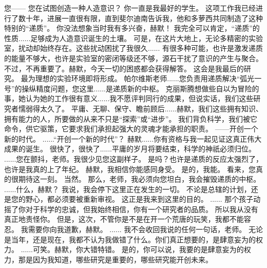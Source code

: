 \documentclass[openany]{book}
\begin{document}
\begin{dialogue}
     您——
     您在试图创造一种人造意识？
     你一直是我最好的学生。
     这项工作我已经进行了数十年，进展一直很有限，直到斐尔迪南告诉我，他和多萝西共同制造了这种特别的“递质”。
     你没法想象当时我有多兴奋，赫默！
     我完全可以肯定，“递质”的性质......足够成为人造意识诞生的土壤。
     可是，在这片大地上，无论多精密的实验室，扰动却始终存在。这些扰动困扰了我很久......
     有很多种可能，也许是激发递质的能量不够大，也许是实验室的密闭等级还不够，源石干扰了意识的产生与聚合。
     不过，不再重要了。赫默，今天一切的困惑都会获得解答。
     这会是我最后的研究。
     最为理想的实验环境即将形成。
     帕尔维斯老师......您负责用递质解决“弧光一号”的操纵精度问题，您这里......是递质新的中枢。
     克丽斯腾想做些自以为冒险的事，她认为她的工作很有意义......我不愿评判同行的成果，但说实话，我们这些研究者懦弱得太久了。
     平庸、无聊、保守、瞻前顾后......赫默，我们这些拥有知识、拥有能力的人，所要做的从来不只是“探索”或“进步”。
     我们背负科学，我们被它命令，供它驱策，它要求我们承担起强大的灵魂才能承担的职责。
     ——开创一个新的时代。
     ......“开创一个新的时代”？
     赫默......你有资格与我一起见证这真正伟大成果的诞生。
     很快了，很快了......平庸的岁月将要结束，科学的神祇必须归位。
     ......您在颤抖，老师。我很少见您这副样子。
     是吗？也许是递质的反应太强烈了，也许是我真的上了年纪。
     赫默，我相信你能感同身受。
     是的，我能。
     看来，您真的很期待这一刻。
     当然。
     那么，老师，我必须向您坦白，我会摧毁递质的中枢。
     ......什么，赫默？
     我说，我会停下这里正在发生的一切。
     不论是总辖的计划，还是您的野心，都必须要被重新审视。
     这正是我来到这里的目的。
     ......
     那个孩子动摇了你对于科学的忠诚，但我始终相信，你有一个研究者的品质。
     所以我从没有真正地责怪你。
     但是，这次，不管你是不是在开一个荒唐的玩笑，我都不能容忍。
     我需要你向我道歉，赫默。
     ......
     我不会收回我说的任何一句话，老师。
     无论是当年，还是现在，我都不认为我做错了什么。你们真正想要的，是肆意妄为的权力。
     ......可笑。赫默，你大错特错。
     是的，你可以说，我要的是肆意妄为的权力，那是因为我知道，哪些研究是重要的，哪些研究能开创未来。

\end{dialogue}
\end{document}
